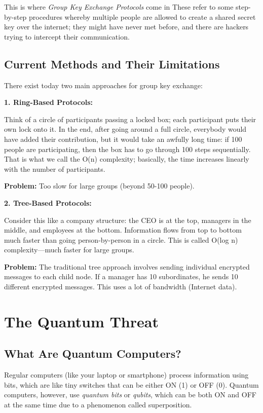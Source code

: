 \documentclass[12pt,a4paper]{report}
\begin{document}
This is where \textit{Group Key Exchange Protocols} come in These refer to some step-by-step procedures whereby multiple people are allowed to create a shared secret key over the internet; they might have never met before, and there are hackers trying to intercept their communication.

\subsection{Current Methods and Their Limitations}

There exist today two main approaches for group key exchange:

\textbf{1. Ring-Based Protocols:}

Think of a circle of participants passing a locked box; each participant puts their own lock onto it. In the end, after going around a full circle, everybody would have added their contribution, but it would take an awfully long time: if 100 people are participating, then the box has to go through 100 steps sequentially. That is what we call the O(n) complexity; basically, the time increases linearly with the number of participants.

\textbf{Problem:} Too slow for large groups (beyond 50-100 people).

\textbf{2. Tree-Based Protocols:}

 Consider this like a company structure: the CEO is at the top, managers in the middle, and employees at the bottom. Information flows from top to bottom much faster than going person-by-person in a circle. This is called O(log n) complexity—much faster for large groups.

\textbf{Problem:} The traditional tree approach involves sending individual encrypted messages to each child node. If a manager has 10 subordinates, he sends 10 different encrypted messages. This uses a lot of bandwidth (Internet data).

\section{The Quantum Threat}

\subsection{What Are Quantum Computers?}

Regular computers (like your laptop or smartphone) process information using bits, which are like tiny switches that can be either ON (1) or OFF (0). Quantum computers, however, use \textit{quantum bits} or \textit{qubits}, which can be both ON and OFF at the same time due to a phenomenon called superposition.
\end{document}
